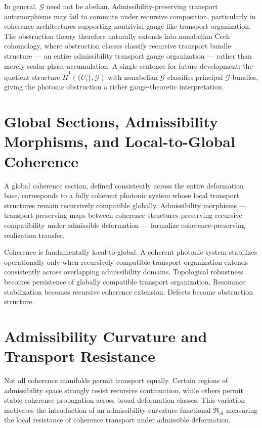 \documentclass[11pt,openany]{book}
\theoremstyle{definition}
\theoremstyle{plain}
\begin{document}
In general, $\mathcal{G}$ need not be abelian. Admissibility-preserving transport automorphisms may fail to commute under recursive composition, particularly in coherence architectures supporting nontrivial gauge-like transport organization. The obstruction theory therefore naturally extends into nonabelian \v{C}ech cohomology, where obstruction classes classify recursive transport bundle structure --- an entire admissibility transport gauge organization --- rather than merely scalar phase accumulation. A single sentence for future development: the quotient structure $\check{H}^1(\{U_i\}, \mathcal{G})$ with nonabelian $\mathcal{G}$ classifies principal $\mathcal{G}$-bundles, giving the photonic obstruction a richer gauge-theoretic interpretation.

\section{Global Sections, Admissibility Morphisms, and Local-to-Global Coherence}

A global coherence section, defined consistently across the entire deformation base, corresponds to a fully coherent photonic system whose local transport structures remain recursively compatible globally. Admissibility morphisms --- transport-preserving maps between coherence structures preserving recursive compatibility under admissible deformation --- formalize coherence-preserving realization transfer.

Coherence is fundamentally local-to-global. A coherent photonic system stabilizes operationally only when recursively compatible transport organization extends consistently across overlapping admissibility domains. Topological robustness becomes persistence of globally compatible transport organization. Resonance stabilization becomes recursive coherence extension. Defects become obstruction structure.

\section{Admissibility Curvature and Transport Resistance}

Not all coherence manifolds permit transport equally. Certain regions of admissibility space strongly resist recursive continuation, while others permit stable coherence propagation across broad deformation classes. This variation motivates the introduction of an admissibility curvature functional $\mathfrak{R}_{\mathcal{A}}$ measuring the local resistance of coherence transport under admissible deformation.
\end{document}
